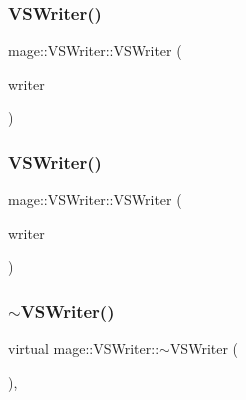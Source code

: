\subsubsection{\texorpdfstring{V\+S\+Writer()}{VSWriter()}\hspace{0.1cm}{\footnotesize\ttfamily [2/3]}}
{\footnotesize\ttfamily mage\+::\+V\+S\+Writer\+::\+V\+S\+Writer (\begin{DoxyParamCaption}\item[{const \hyperlink{classmage_1_1_v_s_writer}{V\+S\+Writer} \&}]{writer }\end{DoxyParamCaption})\hspace{0.3cm}{\ttfamily [delete]}}

\hypertarget{classmage_1_1_v_s_writer_a0e35e2cfa8142ba4176c6259d26ce1b1}{}\label{classmage_1_1_v_s_writer_a0e35e2cfa8142ba4176c6259d26ce1b1} 
\subsubsection{\texorpdfstring{V\+S\+Writer()}{VSWriter()}\hspace{0.1cm}{\footnotesize\ttfamily [3/3]}}
{\footnotesize\ttfamily mage\+::\+V\+S\+Writer\+::\+V\+S\+Writer (\begin{DoxyParamCaption}\item[{\hyperlink{classmage_1_1_v_s_writer}{V\+S\+Writer} \&\&}]{writer }\end{DoxyParamCaption})\hspace{0.3cm}{\ttfamily [delete]}}

\hypertarget{classmage_1_1_v_s_writer_ac2268dde1a58f0d1d657e584e33e82fe}{}\label{classmage_1_1_v_s_writer_ac2268dde1a58f0d1d657e584e33e82fe} 
\subsubsection{\texorpdfstring{$\sim$\+V\+S\+Writer()}{~VSWriter()}}
{\footnotesize\ttfamily virtual mage\+::\+V\+S\+Writer\+::$\sim$\+V\+S\+Writer (\begin{DoxyParamCaption}{ }\end{DoxyParamCaption})\hspace{0.3cm}{\ttfamily [virtual]}, {\ttfamily [default]}}



